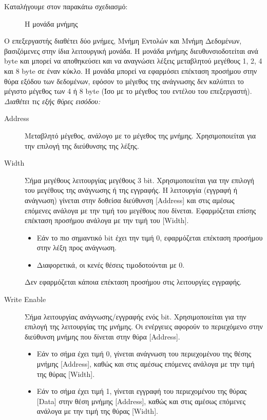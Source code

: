 \documentclass[11pt]{extarticle}
\begin{document}
\newpage
Καταλήγουμε στον παρακάτω σχεδιασμό:
\begin{figure}[H]
    \centering
    \caption[Μονάδα Μνήμης]{Η μονάδα μνήμης}
\end{figure}
Ο επεξεργαστής διαθέτει δύο μνήμες, Μνήμη Εντολών και Μνήμη Δεδομένων, βασιζόμενες στην ίδια λειτουργική μονάδα.
Η μονάδα μνήμης διευθυνσιοδοτείται ανά byte και μπορεί να αποθηκεύσει και να αναγνώσει λέξεις μεταβλητού μεγέθους 1, 2, 4 και 8 byte σε έναν κύκλο. 
Η μονάδα μπορεί να εφαρμόσει επέκταση προσήμου στην θύρα εξόδου των δεδομένων, εφόσον το μέγεθος της ανάγνωσης δεν καλύπτει το μέγιστο μέγεθος των 4 ή 8 byte (Ίσο με το μέγεθος του εντέλου του επεξεργαστή).
\vspace{1em}
\newline
\textit{Διαθέτει τις εξής θύρες εισόδου:}
\begin{description}
 \item[Address] Μεταβλητό μέγεθος, ανάλογο με το μέγεθος της μνήμης. \newline
 Χρησιμοποιείται για την επιλογή της διεύθυνσης της λέξης.
 \item[Width] Σήμα μεγέθους λειτουργίας μεγέθους 3 bit. \newline
 Χρησιμοποιείται για την επιλογή του μεγέθους της ανάγνωσης ή της εγγραφής. 
 Η λειτουργία (εγγραφή ή ανάγνωση) γίνεται στην δοθείσα διεύθυνση [Address] και στις αμέσως επόμενες ανάλογα με την τιμή του μεγέθους που δίνεται.
 Εφαρμόζεται επίσης επέκταση προσήμου ανάλογα με την τιμή του [Width].
 \begin{itemize}
    \item Εάν το πιο σημαντικό bit έχει την τιμή 0, εφαρμόζεται επέκταση προσήμου στην λέξη προς ανάγνωση. 
    \item Διαφορετικά, οι κενές θέσεις τιμοδοτούνται με 0.
 \end{itemize}
 Δεν εφαρμόζεται κάποια επέκταση προσήμου στις λειτουργίες εγγραφής.
 \item[Write Enable] Σήμα λειτουργίας ανάγνωσης/εγγραφής ενός bit. \newline
 Χρησιμοποιείται για την επιλογή της λειτουργίας της μνήμης. 
 Οι ενέργειες αφορούν το περιεχόμενο στην διεύθυνση μνήμης που δίνεται στην θύρα [Address]. 
 \begin{itemize}
     \item Εάν το σήμα έχει τιμή 0, γίνεται ανάγνωση του περιεχομένου της θέσης μνήμης [Address], καθώς και στις αμέσως επόμενες ανάλογα με την τιμή της θύρας [Width].
     \item Εάν το σήμα έχει τιμή 1, γίνεται εγγραφή του περιεχομένου της θύρας [Data] στην θέση μνήμης [Address], καθώς και στις αμέσως επόμενες ανάλογα με την τιμή της θύρας [Width].
 \end{itemize}
\end{description}
\end{document}
